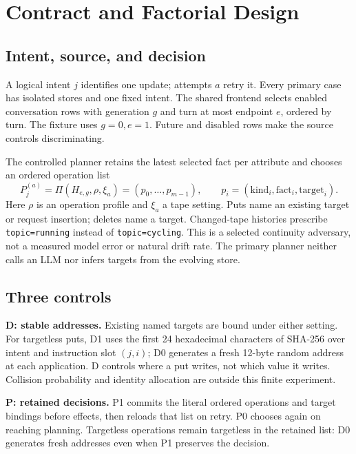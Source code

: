 \documentclass[10pt,letterpaper]{article}
\begin{document}


\section{Contract and Factorial Design}
\label{sec:contract}
\subsection{Intent, source, and decision}
A logical intent $j$ identifies one update; attempts $a$ retry it. Every primary case has isolated stores and one fixed intent. The shared frontend selects enabled conversation rows with generation $g$ and turn at most endpoint $e$, ordered by turn. The fixture uses $g=0,e=1$. Future and disabled rows make the source controls discriminating.

The controlled planner retains the latest selected fact per attribute and chooses an ordered operation list
\begin{equation}
P_j^{(a)}=\Pi(H_{e,g},\rho,\xi_a)=(p_0,\ldots,p_{m-1}),\qquad
p_i=(\mathrm{kind}_i,\mathrm{fact}_i,\mathrm{target}_i).
\label{eq:decision}
\end{equation}
Here $\rho$ is an operation profile and $\xi_a$ a tape setting. Puts name an existing target or request insertion; deletes name a target. Changed-tape histories prescribe \texttt{topic=running} instead of \texttt{topic=cycling}. This is a selected continuity adversary, not a measured model error or natural drift rate. The primary planner neither calls an LLM nor infers targets from the evolving store.

\subsection{Three controls}
\textbf{D: stable addresses.} Existing named targets are bound under either setting. For targetless puts, D1 uses the first 24 hexadecimal characters of SHA-256 over intent and instruction slot $(j,i)$; D0 generates a fresh 12-byte random address at each application. D controls where a put writes, not which value it writes. Collision probability and identity allocation are outside this finite experiment.

\textbf{P: retained decisions.} P1 commits the literal ordered operations and target bindings before effects, then reloads that list on retry. P0 chooses again on reaching planning. Targetless operations remain targetless in the retained list: D0 generates fresh addresses even when P1 preserves the decision.
\end{document}
